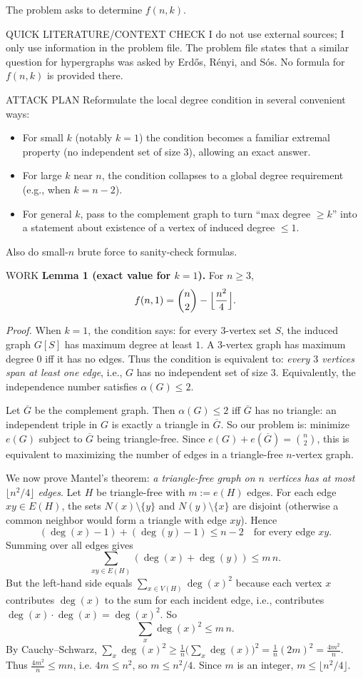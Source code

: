 The problem asks to determine $f(n,k)$.

QUICK LITERATURE/CONTEXT CHECK
I do not use external sources; I only use information in the problem file.
The problem file states that a similar question for hypergraphs was asked by
Erd\H{o}s, R\'enyi, and S\'os.
No formula for $f(n,k)$ is provided there.

ATTACK PLAN
Reformulate the local degree condition in several convenient ways:
\begin{itemize}
\item For small $k$ (notably $k=1$) the condition becomes a familiar extremal
property (no independent set of size $3$), allowing an exact answer.
\item For large $k$ near $n$, the condition collapses to a global degree
requirement (e.g., when $k=n-2$).
\item For general $k$, pass to the complement graph to turn ``max degree $\ge k$''
into a statement about existence of a vertex of induced degree $\le1$.
\end{itemize}
Also do small-$n$ brute force to sanity-check formulas.

WORK
\textbf{Lemma 1 (exact value for $k=1$).}
For $n\ge 3$,
\[
 f(n,1)=\binom{n}{2}-\Bigl\lfloor\frac{n^2}{4}\Bigr\rfloor.
\]

\emph{Proof.}
When $k=1$, the condition says:
for every $3$-vertex set $S$, the induced graph $G[S]$ has maximum degree at
least $1$. A $3$-vertex graph has maximum degree $0$ iff it has no edges.
Thus the condition is equivalent to: \emph{every $3$ vertices span at least one
edge}, i.e., $G$ has no independent set of size $3$.
Equivalently, the independence number satisfies $\alpha(G)\le2$.

Let $\overline{G}$ be the complement graph. Then $\alpha(G)\le2$ iff
$\overline{G}$ has no triangle: an independent triple in $G$ is exactly a
triangle in $\overline{G}$.
So our problem is:
minimize $e(G)$ subject to $\overline{G}$ being triangle-free.
Since $e(G)+e(\overline{G})=\binom{n}{2}$, this is equivalent to maximizing the
number of edges in a triangle-free $n$-vertex graph.

We now prove Mantel's theorem:
\emph{a triangle-free graph on $n$ vertices has at most $\lfloor n^2/4\rfloor$
edges}.
Let $H$ be triangle-free with $m:=e(H)$ edges. For each edge $xy\in E(H)$, the sets
$N(x)\setminus\{y\}$ and $N(y)\setminus\{x\}$ are disjoint (otherwise a common
neighbor would form a triangle with edge $xy$).
Hence
\[
(\deg(x)-1)+(\deg(y)-1) \le n-2\quad\text{for every edge }xy.
\]
Summing over all edges gives
\[
\sum_{xy\in E(H)} (\deg(x)+\deg(y)) \le m\,n.
\]
But the left-hand side equals $\sum_{x\in V(H)} \deg(x)^2$ because each vertex $x$
contributes $\deg(x)$ to the sum for each incident edge, i.e., contributes
$\deg(x)\cdot \deg(x)=\deg(x)^2$.
So
\[
\sum_{x} \deg(x)^2 \le m\,n.
\]
By Cauchy--Schwarz,
$\sum_x \deg(x)^2 \ge \frac{1}{n}\bigl(\sum_x \deg(x)\bigr)^2
=\frac{1}{n}(2m)^2=\frac{4m^2}{n}$.
Thus $\frac{4m^2}{n}\le mn$, i.e. $4m\le n^2$, so $m\le n^2/4$.
Since $m$ is an integer, $m\le \lfloor n^2/4\rfloor$.

